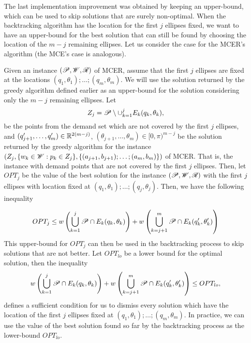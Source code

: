 The last implementation improvement was obtained by keeping an upper-bound, which can be used to skip solutions that are surely non-optimal.
When the backtracking algorithm has the location for the first $j$ ellipses fixed, we want to have an upper-bound for the best solution that can still be found by choosing the location of the $m-j$ remaining ellipses.
Let us consider the case for the MCER's algorithm (the MCE's case is analogous). 

Given an instance $(\mathscr{P}, \mathscr{W}, \mathscr{R})$ of MCER, assume that the first $j$ ellipses are fixed at the locations $(q_1, \theta_1); \dots; (q_m, \theta_m)$. We will use the solution returned by the greedy algorithm defined earlier as an upper-bound for the solution considering only the $m-j$ remaining ellipses. 
Let 
\begin{equation*}
Z_j=\mathscr{P}\setminus \cup_{k=1}^j E_k(q_k, \theta_k),
\end{equation*}
be the points from the demand set which are not covered by the first $j$ ellipses, and $(q_{j+1}', \dots, q_m')\in \mathbb{R}^{2(m-j)}$, $(\theta_{j+1}, \dots, \theta_m) \in [0, \pi)^{m-j}$ be the solution returned by the greedy algorithm for the instance $(Z_j, \{w_k \in \mathscr{W}: p_k \in Z_j\}, \{(a_{j+1}, b_{j+1}); \dots; (a_m, b_m)\})$ of MCER. That is, the instance with demand points that are not covered by the first $j$ ellipses. Then, let $OPT_j$ be the value of the best solution for the instance $(\mathscr{P}, \mathscr{W}, \mathscr{R})$ with the first $j$ ellipses with location fixed at $(q_1, \theta_1); \dots; (q_j, \theta_j)$. Then, we have the following inequality

\begin{equation}
OPT_j \le w\left(\bigcup_{k=1}^{j} \mathscr{P} \cap E_k(q_k, \theta_k)\right) + w\left(\bigcup_{k=j+1}^{m} \mathscr{P} \cap E_k(q_k', \theta_k')\right)
\end{equation}
This upper-bound for $OPT_j$ can then be used in the backtracking process to skip solutions that are not better. Let $OPT_{lo}$ be a lower bound for the optimal solution, then the inequality
\begin{equation}
\label{eq:upper-bound}
w\left(\bigcup_{k=1}^{j} \mathscr{P} \cap E_k(q_k, \theta_k)\right) +w\left(\bigcup_{k=j+1}^{m} \mathscr{P} \cap E_k(q_k', \theta_k')\right) \le OPT_{lo},
\end{equation}
defines a sufficient condition for us to dismiss every solution which have the location of the first $j$ ellipses fixed at $(q_1, \theta_1); \dots; (q_m, \theta_m)$. In practice, we can use the value of the best solution found so far by the backtracking process as the lower-bound $OPT_{lo}$.

